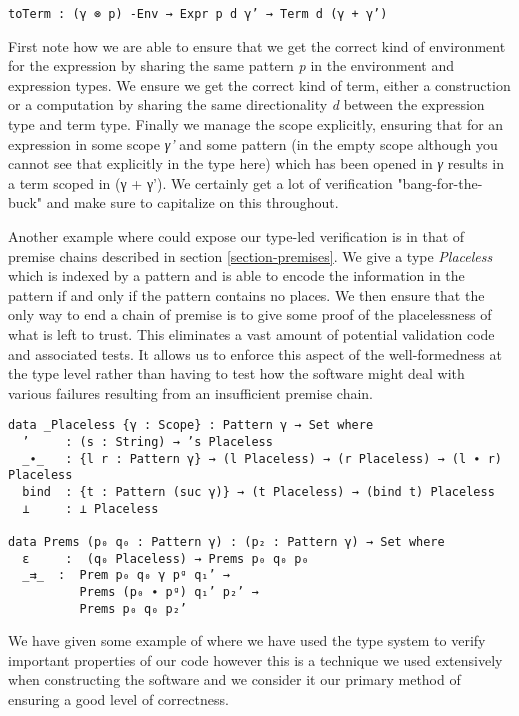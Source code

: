 \begin{verbatim}
toTerm : (γ ⊗ p) -Env → Expr p d γ’ → Term d (γ + γ’)
\end{verbatim}

First note how we are able to ensure that we get the correct kind of
environment for the expression by sharing the same pattern \emph{p} in
the environment and expression types. We ensure we get the correct
kind of term, either a construction or a computation by sharing the
same directionality \emph{d} between the expression type and term
type. Finally we manage the scope explicitly, ensuring that for an
expression in some scope \emph{γ'} and some pattern (in the empty
scope although you cannot see that explicitly in the type here) which
has been opened in \emph{γ} results in a term scoped in (γ + γ'). We
certainly get a lot of verification "bang-for-the-buck" and make sure
to capitalize on this throughout.

Another example where could expose our type-led verification is in
that of premise chains described in section \ref{section-premises}. We
give a type \emph{Placeless} which is indexed by a pattern and is able
to encode the information in the pattern if and only if the pattern
contains no places. We then ensure that the only way to end a chain of
premise is to give some proof of the placelessness of what is left to
trust. This eliminates a vast amount of potential validation code and
associated tests. It allows us to enforce this aspect of the
well-formedness at the type level rather than having to test how the
software might deal with various failures resulting from an insufficient
premise chain.

\begin{verbatim}
data _Placeless {γ : Scope} : Pattern γ → Set where
  ’     : (s : String) → ’s Placeless
  _∙_   : {l r : Pattern γ} → (l Placeless) → (r Placeless) → (l ∙ r) Placeless
  bind  : {t : Pattern (suc γ)} → (t Placeless) → (bind t) Placeless
  ⊥     : ⊥ Placeless

data Prems (p₀ q₀ : Pattern γ) : (p₂ : Pattern γ) → Set where
  ε     :  (q₀ Placeless) → Prems p₀ q₀ p₀
  _⇉_  :  Prem p₀ q₀ γ pᵍ q₁’ →
          Prems (p₀ ∙ pᵍ) q₁’ p₂’ →
          Prems p₀ q₀ p₂’
\end{verbatim}

We have given some example of where we have used the type system to
verify important properties of our code however this is a technique we
used extensively when constructing the software and we consider it our
primary method of ensuring a good level of correctness.

